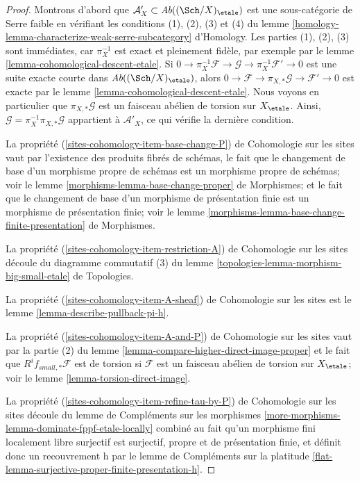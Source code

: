 \begin{proof}
Montrons d'abord que $\mathcal{A}'_X \subset \textit{Ab}((\Sch/X)_\etale)$
est une sous-catégorie de Serre faible en vérifiant les conditions (1), (2), (3) et (4)
du lemme \ref{homology-lemma-characterize-weak-serre-subcategory} d'Homology.
Les parties (1), (2), (3) sont immédiates, car $\pi_X^{-1}$ est exact et
pleinement fidèle, par exemple par le lemme \ref{lemma-cohomological-descent-etale}. Si
$0 \to \pi_X^{-1}\mathcal{F} \to \mathcal{G} \to \pi_X^{-1}\mathcal{F}' \to 0$
est une suite exacte courte dans $\textit{Ab}((\Sch/X)_\etale)$,
alors $0 \to \mathcal{F} \to \pi_{X, *}\mathcal{G} \to \mathcal{F}' \to 0$
est exacte par le lemme \ref{lemma-cohomological-descent-etale}.
Nous voyons en particulier que $\pi_{X, *}\mathcal{G}$ est un faisceau
abélien de torsion sur $X_\etale$.
Ainsi, $\mathcal{G} = \pi_X^{-1}\pi_{X, *}\mathcal{G}$ appartient à
$\mathcal{A}'_X$, ce qui vérifie la dernière condition.

\medskip\noindent
La propriété (\ref{sites-cohomology-item-base-change-P}) de Cohomologie sur les sites vaut
par l'existence des produits fibrés de schémas,
le fait que le changement de base d'un morphisme propre de
schémas est un morphisme propre de schémas; voir le
lemme \ref{morphisms-lemma-base-change-proper} de Morphismes; et
le fait que le changement de base d'un morphisme de présentation finie
est un morphisme de présentation finie; voir le
lemme \ref{morphisms-lemma-base-change-finite-presentation} de Morphismes.

\medskip\noindent
La propriété (\ref{sites-cohomology-item-restriction-A}) de Cohomologie sur les sites
découle du diagramme commutatif (3) du
lemme \ref{topologies-lemma-morphism-big-small-etale} de Topologies.

\medskip\noindent
La propriété (\ref{sites-cohomology-item-A-sheaf}) de Cohomologie sur les sites est le
lemme \ref{lemma-describe-pullback-pi-h}.

\medskip\noindent
La propriété (\ref{sites-cohomology-item-A-and-P}) de Cohomologie sur les sites vaut par la
partie (2) du lemme \ref{lemma-compare-higher-direct-image-proper}
et le fait que $R^if_{small,*}\mathcal{F}$
est de torsion si $\mathcal{F}$ est un faisceau
abélien de torsion sur $X_\etale$; voir le lemme \ref{lemma-torsion-direct-image}.

\medskip\noindent
La propriété (\ref{sites-cohomology-item-refine-tau-by-P}) de Cohomologie sur les sites
découle du lemme de Compléments sur les morphismes
\ref{more-morphisms-lemma-dominate-fppf-etale-locally}
combiné au fait qu'un morphisme fini localement libre surjectif
est surjectif, propre et de présentation finie, et définit donc
un recouvrement h par le lemme de Compléments sur la platitude
\ref{flat-lemma-surjective-proper-finite-presentation-h}.
\end{proof}

